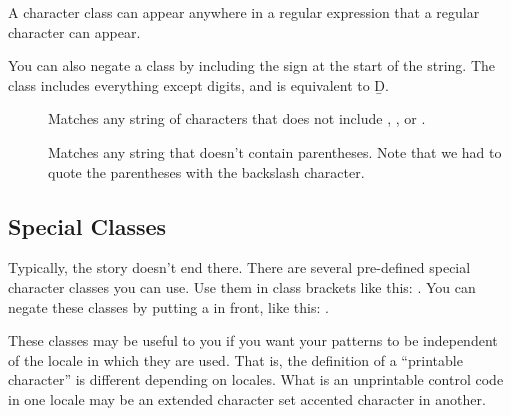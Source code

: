 \documentclass{dods-book}
\begin{document}
A character class can appear anywhere in a regular expression that a
regular character can appear.

You can also negate a class by including the \lit{\^{}} sign at the
start of the string.  The class \lit{[\^{}0-9]} includes everything
except digits, and is equivalent to \b{D}.

\begin{description}
\item[\lit{[\^{}abc]*}] Matches any string of characters that does not
  include , , or .

\item[\lit{[\^{}\b{(}\b{)}]}] Matches any string that doesn't contain
  parentheses.  Note that we had to quote the parentheses with the
  backslash character. 
\end{description}

\subsection{Special Classes}

Typically, the story doesn't end there.  There are several pre-defined
special character classes you can use.  Use them in class brackets
like this: \lit{[:alpha:]}.  You can negate these classes by putting a
\lit{\^{}} in front, like this: \lit{[:\^{}alpha:]}.

These classes may be useful to you if you want your patterns to be
independent of the locale in which they are used.  That is, the
definition of a ``printable character'' is different depending on
locales.  What is an unprintable control code in one locale may be an
extended character set accented character in another.

\end{document}
